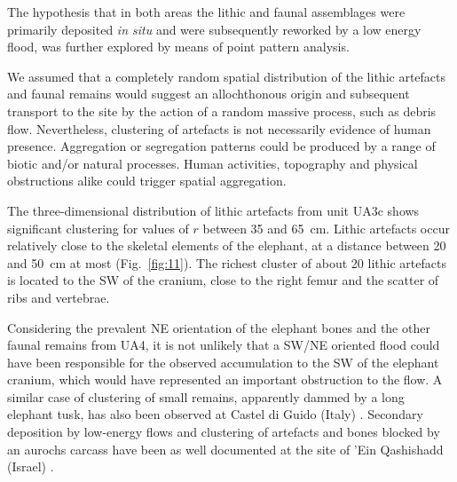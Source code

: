 \documentclass[preprint,authoryear,times]{elsarticle} %
\begin{document}


The hypothesis that in both areas the lithic and faunal assemblages were primarily deposited \emph{in situ} and were subsequently reworked by a low energy flood, was further explored by means of point pattern analysis.

We assumed that a completely random spatial distribution of the lithic artefacts and faunal remains would suggest an allochthonous origin and subsequent transport to the site by the action of a random massive process, such as debris flow. Nevertheless, clustering of artefacts is not necessarily evidence of human presence. Aggregation or segregation patterns could be produced by a range of biotic and/or natural processes. Human activities, topography and physical obstructions alike could trigger spatial aggregation.


The three-dimensional distribution of lithic artefacts from unit UA3c shows significant clustering for values of $r$ between 35 and 65~cm. Lithic artefacts occur relatively close to the skeletal elements of the elephant, at a distance between 20 and 50~cm at most (Fig.~\ref{fig:11}). The richest cluster of about 20 lithic artefacts is located to the SW of the cranium, close to the right femur and the scatter of ribs and vertebrae.

Considering the prevalent NE orientation of the elephant bones and the other faunal remains from UA4, it is not unlikely that a SW/NE oriented flood could have been responsible for the observed accumulation to the SW of the elephant cranium, which would have represented an important obstruction to the flow. A similar case of clustering of small remains, apparently dammed by a long elephant tusk, has also been observed at Castel di Guido (Italy) \citep{Boschian2010}. Secondary deposition by low-energy flows and clustering of artefacts and bones blocked by an aurochs carcass have been as well documented at the site of 'Ein Qashishadd (Israel) \citep{Hovers2014}.
\end{document}
